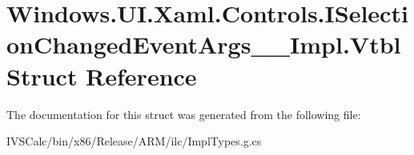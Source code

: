 \hypertarget{struct_windows_1_1_u_i_1_1_xaml_1_1_controls_1_1_i_selection_changed_event_args_____impl_1_1_vtbl}{}\section{Windows.\+U\+I.\+Xaml.\+Controls.\+I\+Selection\+Changed\+Event\+Args\+\_\+\+\_\+\+Impl.\+Vtbl Struct Reference}
\label{struct_windows_1_1_u_i_1_1_xaml_1_1_controls_1_1_i_selection_changed_event_args_____impl_1_1_vtbl}


The documentation for this struct was generated from the following file\+:\begin{DoxyCompactItemize}
\item 
I\+V\+S\+Calc/bin/x86/\+Release/\+A\+R\+M/ilc/Impl\+Types.\+g.\+cs\end{DoxyCompactItemize}
